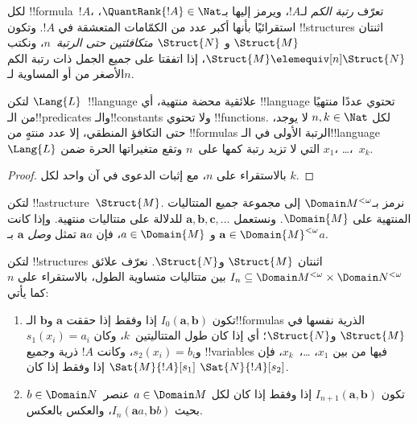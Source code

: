 \documentclass[../../../include/open-logic-section]{subfiles}
\begin{document}
\begin{defn}
  لكل !!{formula}~$!A$، تعرّف \emph{رتبة الكم} لـ$!A$، ويرمز إليها
  بـ$\QuantRank{!A} \in \Nat$، استقرائيًا بأنها أكبر عدد من الكمّامات
  المتعشقة في $!A$. وتكون !!{structure}s اثنتان $\Struct{M}$ و
  $\Struct{N}$ \emph{متكافئتين حتى الرتبة~$n$}، ونكتب
  $\Struct{M} \elemequiv[n] \Struct{N}$، إذا اتفقتا على جميع الجمل ذات
  رتبة الكم الأصغر من أو المساوية لـ$n$.
\end{defn}

\begin{prop}
  لتكن $\Lang{L}$~!!{language} علائقية محضة منتهية، أي !!{language}
  تحتوي عددًا منتهيًا من الـ!!{predicate}s والـ!!{constant}s ولا تحتوي
  !!{function}s. لكل $n,k \in \Nat$ لا يوجد، حتى التكافؤ المنطقي، إلا
  عدد منتهٍ من !!{formula}s الرتبة الأولى في الـ!!{language}~$\Lang{L}$ التي لا تزيد
  رتبة كمها على~$n$ وتقع متغيراتها الحرة ضمن $x_1$، \dots،~$x_k$.
\end{prop}

\begin{proof}
  بالاستقراء على $n$، مع إثبات الدعوى في آن واحد لكل $k$.
\end{proof}

\begin{defn}
  لتكن !!a{structure}~$\Struct{M}$. نرمز بـ$\Domain M^{<\omega}$ إلى
  مجموعة جميع المتتاليات المنتهية على $\Domain{M}$. ونستعمل
  $\mathbf{a}, \mathbf{b}, \mathbf{c}, \ldots$ للدلالة على متتاليات
  منتهية. وإذا كانت $\mathbf{a} \in \Domain{M}^{<\omega}$ و
  $a \in \Domain{M}$، فإن $\mathbf{a}a$ تمثل \emph{وصل}
  $\mathbf{a}$ بـ$a$.
\end{defn}

\begin{defn}
  لتكن !!{structure}s اثنتان $\Struct{M}$ و$\Struct{N}$. نعرّف علائق
  $I_n \subseteq \Domain M^{<\omega} \times \Domain N^{<\omega}$ بين
  متتاليات متساوية الطول، بالاستقراء على $n$ كما يأتي:
   \begin{enumerate}
   \item تكون $I_0(\mathbf{a},\mathbf{b})$ إذا وفقط إذا حققت
     $\mathbf{a}$ و$\mathbf{b}$ الـ!!{formula}s الذرية نفسها في
     $\Struct{M}$ و$\Struct{N}$؛ أي إذا كان طول المتتاليتين~$k$، وكان
     $s_1(x_i)=a_i$ و$s_2(x_i)=b_i$، وكانت $!A$ ذرية وجميع
     !!{variable}s فيها من بين $x_1$، \dots،~$x_k$، فإن
     $\Sat{M}{!A}[s_1]$ إذا وفقط إذا كان $\Sat{N}{!A}[s_2]$.
   \item تكون $I_{n+1}(\mathbf{a},\mathbf{b})$ إذا وفقط إذا كان لكل
     $a\in \Domain M$ عنصر~$b\in \Domain N$ بحيث
     $I_n(\mathbf{a}a,\mathbf{b}b)$، والعكس بالعكس.
   \end{enumerate}
\end{defn}
\end{document}
